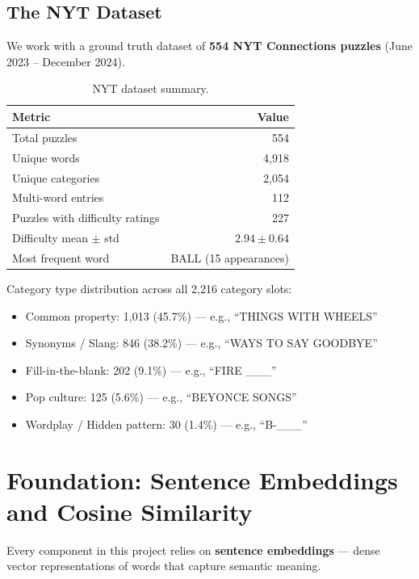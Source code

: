 \documentclass[11pt, letterpaper]{article}
\begin{document}
\subsection{The NYT Dataset}

We work with a ground truth dataset of \textbf{554 NYT Connections puzzles} (June 2023 -- December 2024).

\begin{table}[H]
\centering
\caption{NYT dataset summary.}
\begin{tabular}{@{}lr@{}}
\toprule
Metric & Value \\
\midrule
Total puzzles & 554 \\
Unique words & 4,918 \\
Unique categories & 2,054 \\
Multi-word entries & 112 \\
Puzzles with difficulty ratings & 227 \\
Difficulty mean $\pm$ std & $2.94 \pm 0.64$ \\
Most frequent word & BALL (15 appearances) \\
\bottomrule
\end{tabular}
\end{table}

Category type distribution across all 2,216 category slots:
\begin{itemize}[nosep]
    \item Common property: 1,013 (45.7\%) --- e.g., ``THINGS WITH WHEELS''
    \item Synonyms / Slang: 846 (38.2\%) --- e.g., ``WAYS TO SAY GOODBYE''
    \item Fill-in-the-blank: 202 (9.1\%) --- e.g., ``FIRE \_\_\_''
    \item Pop culture: 125 (5.6\%) --- e.g., ``BEYONCE SONGS''
    \item Wordplay / Hidden pattern: 30 (1.4\%) --- e.g., ``B-\_\_\_''
\end{itemize}

\section{Foundation: Sentence Embeddings and Cosine Similarity}

Every component in this project relies on \textbf{sentence embeddings} --- dense vector representations of words that capture semantic meaning.
\end{document}
